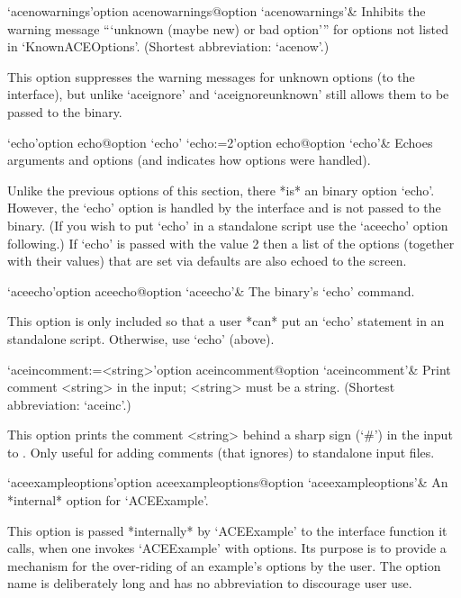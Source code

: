 \>`acenowarnings'{option acenowarnings}@{option `acenowarnings'}& 
Inhibits the warning message ```unknown (maybe new) or bad option'''
for options not listed in `KnownACEOptions'.
(Shortest abbreviation: `acenow'.)

This option suppresses the warning messages for  unknown  options  (to
the {\ACE} interface), but unlike `aceignore'  and  `aceignoreunknown'
still allows them to be passed to the {\ACE} binary.

\>`echo'{option echo}@{option `echo'} 
\>`echo:=2'{option echo}@{option `echo'}& 
Echoes arguments and options (and indicates how options were handled).

Unlike the previous options of this  section,  there  *is*  an  {\ACE}
binary option `echo'. However, the `echo' option  is  handled  by  the
{\ACE} interface and is not passed to the {\ACE} binary. (If you  wish
to put  `echo'  in  a  standalone  script  use  the  `aceecho'  option
following.) If `echo' is passed with the value 2 then a  list  of  the
options (together with their values) that are set via {\ACE}  defaults
are also echoed to the screen.

\>`aceecho'{option aceecho}@{option `aceecho'}& 
The {\ACE} binary's `echo' command.

This option is only included so  that  a  user  *can*  put  an  `echo'
statement in  an  {\ACE}  standalone  script.  Otherwise,  use  `echo'
(above).

\>`aceincomment:=<string>'{option aceincomment}@{option `aceincomment'}&
Print comment <string> in the {\ACE} input; <string> must be a string.
(Shortest abbreviation: `aceinc'.)

This option prints the comment <string> behind a sharp sign (`\#')  in
the input to {\ACE}. Only useful  for  adding  comments  (that  {\ACE}
ignores) to standalone input files.

\>`aceexampleoptions'{option aceexampleoptions}@{option `aceexampleoptions'}&
An *internal* option for `ACEExample'.

This option is passed  *internally*  by  `ACEExample'  to  the  {\ACE}
interface function  it  calls,  when  one  invokes  `ACEExample'  with
options. Its purpose is to provide a mechanism for the over-riding  of
an example's options by the user. The option name is deliberately long
and has no abbreviation to discourage user use.

\enditems

\nolabel

